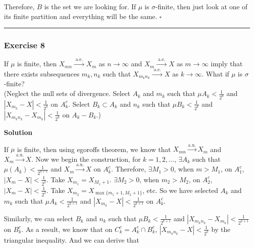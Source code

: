 \documentclass[
]{article}
\begin{document}
Therefore, \(B\) is the set we are looking for. If \(\mu\) is
\(\sigma\)-finite, then just look at one of its finite partition and
everything will be the same. \(\square\)

\begin{center}\rule{0.5\linewidth}{0.5pt}\end{center}

\hypertarget{exercise-8}{%
  \subsubsection{Exercise 8}\label{exercise-8}}

If \(\mu\) is finite, then
\(X_{m n} \stackrel{\text { a.e. }}{\longrightarrow} X_m\) as
\(n \rightarrow \infty\) and
\(X_m \stackrel{\text { a.e. }}{\longrightarrow} X\) as
\(m \rightarrow \infty\) imply that there exists subsequences
\(m_k, n_k\) such that
\(X_{m_k n_k} \stackrel{\text { a.e. }}{\longrightarrow} X\) as
\(k \rightarrow \infty\). What if \(\mu\) is \(\sigma\)-finite?\\
(Neglect the null sets of divergence. Select \(A_k\) and \(m_k\) such
that \(\mu A_k<\frac{1}{2^k}\) and
\(\left|X_{m_k}-X\right|<\frac{1}{2^k}\) on \(A_k^c\). Select
\(B_k \subset A_k\) and \(n_k\) such that \(\mu B_k<\frac{1}{2^k}\) and
\(\left|X_{m_k n_k}-X_{m_k}\right|<\frac{1}{2^k}\) on \(A_k-B_k\).)

\textbf{Solution}

If \(\mu\) is finite, then using egoroff\textquotesingle s theorem, we
know that \(X_{mn} \xrightarrow{\text{a.u.}} X_m\) and
\(X_m\xrightarrow{\text{a.u.}} X\). Now we begin the construction, for
\(k = 1, 2, \dots\), \(\exists A_k\) such that
\(\mu(A_k) < \frac{1}{2^{k+1}}\) and \(X_m \xrightarrow{\text{a.u.}} X\)
on \(A_k^c\). Therefore, \(\exists M_1 >0\), when \(m > M_1\), on
\(A_1^c\), \(|X_m - X| < \frac{1}{2^2}\). Take \(X_{m_1} = X_{M_1+1}\).
\(\exists M_2 >0\), when \(m_2 > M_2\), on \(A_2^c\),
\(|X_m - X| < \frac{1}{2^3}\). Take
\(X_{m_2} = X_{\max\{m_1+1, M_2+1\}}\), etc. So we have selected \(A_k\)
and \(m_k\) such that \(\mu A_k<\frac{1}{2^{k+1}}\) and
\(\left|X_{m_k}-X\right|<\frac{1}{2^{k+1}}\) on \(A_k^c\).

Similarly, we can select \(B_k\) and \(n_k\) such that
\(\mu B_k<\frac{1}{2^{k+1}}\) and
\(\left|X_{m_k n_k}-X_{m_k}\right|<\frac{1}{2^{k+1}}\) on \(B_k^c\). As
a result, we know that on \(C_k^c = A^c_k \cap B_k^c\),
\(\left|X_{m_k n_k}-X\right|<\frac{1}{2^{k}}\) by the triangular
inequality. And we can derive that
\end{document}
